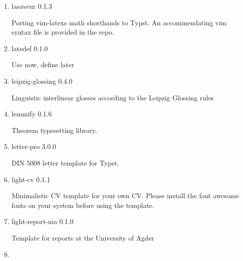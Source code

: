 \begin{enumerate}
  { lambdabus } { 0.1.0 }

  Easily parse, normalize and display simple Î»-Calculus expressions.
\item
  \href{/universe/package/lasaveur/}{}

  { lasaveur } { 0.1.3 }

  Porting vim-latex\textquotesingle s math shorthands to Typst. An
  accommendating vim syntax file is provided in the repo.
\item
  \href{/universe/package/latedef/}{}

  { latedef } { 0.1.0 }

  Use now, define later
\item
  \href{/universe/package/leipzig-glossing/}{}

  { leipzig-glossing } { 0.4.0 }

  Linguistic interlinear glosses according to the Leipzig Glossing rules
\item
  \href{/universe/package/lemmify/}{}

  { lemmify } { 0.1.6 }

  Theorem typesetting library.
\item
  \href{/universe/package/letter-pro/}{}


  { letter-pro } { 3.0.0 }

  DIN 5008 letter template for Typst.
\item
  \href{/universe/package/light-cv/}{}


  { light-cv } { 0.1.1 }

  Minimalistic CV template for your own CV. Please install the font
  awesome fonts on your system before using the template.
\item
  \href{/universe/package/light-report-uia/}{}


  { light-report-uia } { 0.1.0 }

  Template for reports at the University of Agder
\item
  \href{/universe/package/lineal/}{}


\end{enumerate}
